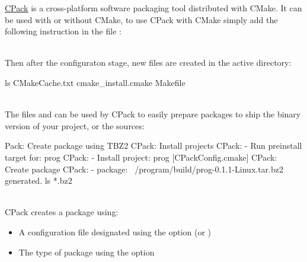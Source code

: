 \href{https://cmake.org/cmake/help/book/mastering-cmake/chapter/Packaging\%20With\%20CPack.html}{CPack} is a cross-platform software packaging tool distributed with CMake. 
It can be used with or without CMake, to use CPack with CMake simply add the following instruction in the file :
\begin{script}
\end{script}
\\[-0.5cm]
\noindent Then after the configuraton stage, new files are created in the active directory: 
\begin{script}
 ls 
CMakeCache.txt                         cmake_install.cmake  
    Makefile
\end{script}\\[-0.5cm]
The files  and  can be used by CPack to easily prepare packages to ship the binary version of your project, or the sources: 
\begin{script}
     
Pack: Create package using TBZ2
CPack: Install projects
CPack: - Run preinstall target for: prog
CPack: - Install project: prog [CPackConfig.cmake]
CPack: Create package
CPack: - package: ~/program/build/prog-0.1.1-Linux.tar.bz2 generated.
 ls *.bz2
\end{script}
\\[-0.5cm]
CPack creates a package using: 
\begin{itemize}
\item A configuration file designated using the option  (or )
\item The type of package using the option 
\end{itemize}
